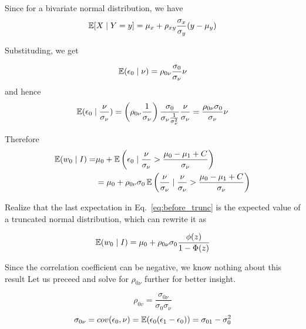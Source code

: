Since for a bivariate normal distribution, we have 
\begin{equation}
    \label{eq:biv-exp}
    \operatorname{\mathbb{E}}[X \mid Y=y] = \mu_x + \rho_{xy}\frac{\sigma_x}{\sigma_y}(y - \mu_y) 
\end{equation}

Substituding, we get

\begin{equation*}
    \operatorname{\mathbb{E}}(\epsilon_0 \mid \nu)=\rho_{0\nu}\frac{\sigma_0}{\sigma_\nu}\nu
\end{equation*}
and hence
\begin{equation}
    \label{eq:biv_normal_exp_0}
    \operatorname{\mathbb{E}}(\epsilon_0 \mid \frac{\nu}{\sigma_\nu})=
    \left(\rho_{0\nu} \frac{1}{\sigma_\nu}\right)
    \frac{\sigma_0}{\sigma_\nu \frac{1}{\sigma_\nu^2}}
    \frac{\nu}{\sigma_\nu}=\frac{\rho_{0\nu}\sigma_0 }{\sigma_\nu}\nu
\end{equation}

Therefore
\begin{align}
    \operatorname{\mathbb{E}}(w_{0} \mid I) =& 
     \mu_0 + \operatorname{\mathbb{E}} \left(
            \epsilon_0 \mid \frac{\nu}{\sigma_\nu} > \frac{\mu_0 - \mu_1 + C}{\sigma_\nu}
            \right) \nonumber \\
    &= \mu_0 + \rho_{0\nu}\sigma_0 \operatorname{\mathbb{E}} \left(
        \frac{\nu}{\sigma_\nu} 
        \mid
        \frac{\nu}{\sigma_\nu} > \frac{\mu_0 - \mu_1 + C}{\sigma_\nu}
    \right) \label{eq:before_trunc}
\end{align}

Realize that the last expectation in Eq.~\ref{eq:before_trunc}
is the expected value of a truncated normal distribution, 
which can rewrite it as 

\begin{equation}
    \label{eq:exp_wo_1}
    \operatorname{\mathbb{E}}(w_{0} \mid I) = 
    \mu_0 + \rho_{0\nu}\sigma_0 \frac{\phi(z)}{1-\Phi(z)}
\end{equation}

Since the correlation coefficient can be negative,
 we know nothing about this result
Let us preceed and solve for $\rho_{0\nu}$ 
further for better insight. 


\begin{equation*}
    \rho_{0v} = \frac{\sigma_{0\nu}}{\sigma_0\sigma_\nu}
\end{equation*}
\begin{equation}
    \label{eq:cov_0_nu}
    \sigma_{0\nu}=cov(\epsilon_0, \nu)=\operatorname{\mathbb{E}}(\epsilon_0 (\epsilon_1 - \epsilon_0)) = \sigma_{01}-\sigma_0^2
\end{equation}

